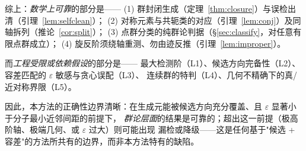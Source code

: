 综上：\emph{数学上可靠}的部分是——
(1) 群封闭生成（定理~\ref{thm:closure}）与误检出清（引理~\ref{lem:selfclean}）；
(2) 对称元素与共轭类的对应（引理~\ref{lem:conj}）及同轴拆列（推论~\ref{cor:split}）；
(3) 点群分类的纯群论判据（\S\ref{sec:classify}，对任意有限点群成立）；
(4) 旋反阶须绕轴重测、勿由迹反推（引理~\ref{lem:improper}）。

而\emph{工程受限或依赖假设}的部分是——
最大检测阶（L1）、候选方向完备性（L2）、容差匹配的 $\varepsilon$ 敏感与贪心误配（L3）、
连续群的特判（L4）、几何不精确下的真/近对称界限（L5）。

因此，本方法的正确性边界清晰：在生成元能被候选方向充分覆盖、且 $\varepsilon$ 显著小于分子最小近邻间距的前提下，
\emph{群论层面}的结果是可靠的；超出这一前提（极高阶轴、极端几何、或 $\varepsilon$ 过大）则可能出现
漏检或降级——这是任何基于"候选 + 容差"的方法所共有的边界，而非本方法特有的缺陷。
